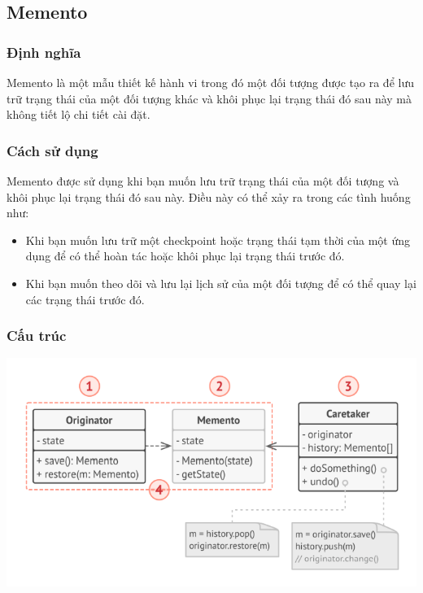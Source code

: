 \subsection{Memento}
\subsubsection{Định nghĩa}
Memento là một mẫu thiết kế hành vi trong đó một đối tượng được tạo ra để lưu trữ trạng thái của một đối tượng khác và khôi phục lại trạng thái đó sau này mà không tiết lộ chi tiết cài đặt.
\subsubsection{Cách sử dụng}
Memento được sử dụng khi bạn muốn lưu trữ trạng thái của một đối tượng và khôi phục lại trạng thái đó sau này. Điều này có thể xảy ra trong các tình huống như:
\begin{itemize}
    \item Khi bạn muốn lưu trữ một checkpoint hoặc trạng thái tạm thời của một ứng dụng để có thể hoàn tác hoặc khôi phục lại trạng thái trước đó.
    \item Khi bạn muốn theo dõi và lưu lại lịch sử của một đối tượng để có thể quay lại các trạng thái trước đó.
\end{itemize}
\subsubsection{Cấu trúc}
\begin{center}
    \includegraphics[scale = 0.6]{image/behavioral/memento.png}
\end{center}
